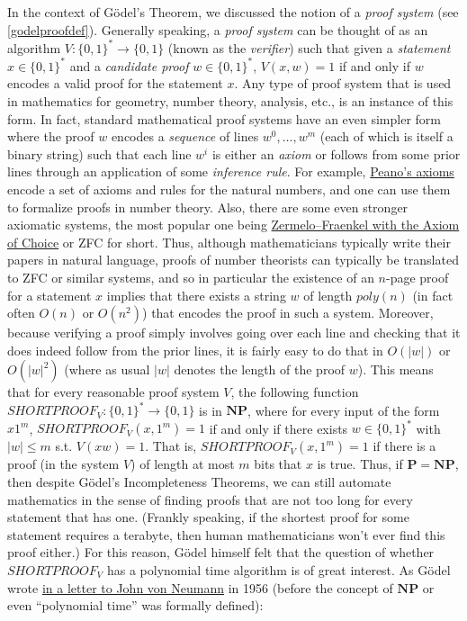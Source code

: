 In the context of Gödel's Theorem, we discussed the notion of a
\emph{proof system} (see \cref{godelproofdef}). Generally speaking, a
\emph{proof system} can be thought of as an algorithm
\(V:\{0,1\}^* \rightarrow \{0,1\}\) (known as the \emph{verifier}) such
that given a \emph{statement} \(x\in \{0,1\}^*\) and a \emph{candidate
proof} \(w\in \{0,1\}^*\), \(V(x,w)=1\) if and only if \(w\) encodes a
valid proof for the statement \(x\). Any type of proof system that is
used in mathematics for geometry, number theory, analysis, etc., is an
instance of this form. In fact, standard mathematical proof systems have
an even simpler form where the proof \(w\) encodes a \emph{sequence} of
lines \(w^0,\ldots,w^m\) (each of which is itself a binary string) such
that each line \(w^i\) is either an \emph{axiom} or follows from some
prior lines through an application of some \emph{inference rule}. For
example, \href{https://en.wikipedia.org/wiki/Peano_axioms}{Peano's
axioms} encode a set of axioms and rules for the natural numbers, and
one can use them to formalize proofs in number theory. Also, there are
some even stronger axiomatic systems, the most popular one being
\href{https://en.wikipedia.org/wiki/Zermelo\%E2\%80\%93Fraenkel_set_theory}{Zermelo--Fraenkel
with the Axiom of Choice} or ZFC for short. Thus, although
mathematicians typically write their papers in natural language, proofs
of number theorists can typically be translated to ZFC or similar
systems, and so in particular the existence of an \(n\)-page proof for a
statement \(x\) implies that there exists a string \(w\) of length
\(poly(n)\) (in fact often \(O(n)\) or \(O(n^2)\)) that encodes the
proof in such a system. Moreover, because verifying a proof simply
involves going over each line and checking that it does indeed follow
from the prior lines, it is fairly easy to do that in \(O(|w|)\) or
\(O(|w|^2)\) (where as usual \(|w|\) denotes the length of the proof
\(w\)). This means that for every reasonable proof system \(V\), the
following function
\(\ensuremath{\mathit{SHORTPROOF}}_V:\{0,1\}^* \rightarrow \{0,1\}\) is
in \(\mathbf{NP}\), where for every input of the form \(x1^m\),
\(\ensuremath{\mathit{SHORTPROOF}}_V(x,1^m)=1\) if and only if there
exists \(w\in \{0,1\}^*\) with \(|w|\leq m\) s.t. \(V(xw)=1\). That is,
\(\ensuremath{\mathit{SHORTPROOF}}_V(x,1^m)=1\) if there is a proof (in
the system \(V\)) of length at most \(m\) bits that \(x\) is true. Thus,
if \(\mathbf{P}=\mathbf{NP}\), then despite Gödel's Incompleteness
Theorems, we can still automate mathematics in the sense of finding
proofs that are not too long for every statement that has one. (Frankly
speaking, if the shortest proof for some statement requires a terabyte,
then human mathematicians won't ever find this proof either.) For this
reason, Gödel himself felt that the question of whether
\(\ensuremath{\mathit{SHORTPROOF}}_V\) has a polynomial time algorithm
is of great interest. As Gödel wrote
\href{https://rjlipton.wordpress.com/the-gdel-letter/}{in a letter to
John von Neumann} in 1956 (before the concept of \(\mathbf{NP}\) or even
``polynomial time'' was formally defined):

